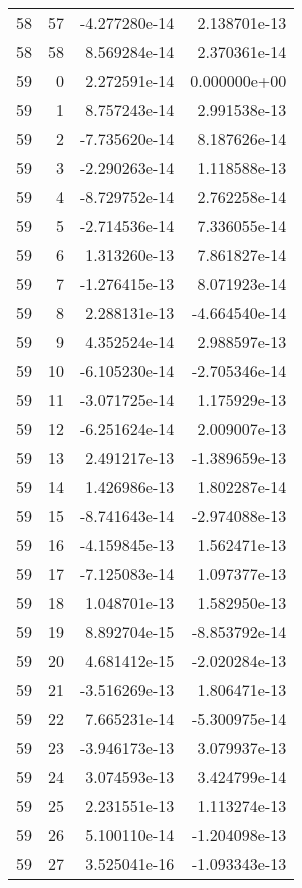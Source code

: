 \begin{tabular}{rrrr}
  58 &   57 & -4.277280e-14 &  2.138701e-13 \\
  58 &   58 &  8.569284e-14 &  2.370361e-14 \\
  59 &    0 &  2.272591e-14 &  0.000000e+00 \\
  59 &    1 &  8.757243e-14 &  2.991538e-13 \\
  59 &    2 & -7.735620e-14 &  8.187626e-14 \\
  59 &    3 & -2.290263e-14 &  1.118588e-13 \\
  59 &    4 & -8.729752e-14 &  2.762258e-14 \\
  59 &    5 & -2.714536e-14 &  7.336055e-14 \\
  59 &    6 &  1.313260e-13 &  7.861827e-14 \\
  59 &    7 & -1.276415e-13 &  8.071923e-14 \\
  59 &    8 &  2.288131e-13 & -4.664540e-14 \\
  59 &    9 &  4.352524e-14 &  2.988597e-13 \\
  59 &   10 & -6.105230e-14 & -2.705346e-14 \\
  59 &   11 & -3.071725e-14 &  1.175929e-13 \\
  59 &   12 & -6.251624e-14 &  2.009007e-13 \\
  59 &   13 &  2.491217e-13 & -1.389659e-13 \\
  59 &   14 &  1.426986e-13 &  1.802287e-14 \\
  59 &   15 & -8.741643e-14 & -2.974088e-13 \\
  59 &   16 & -4.159845e-13 &  1.562471e-13 \\
  59 &   17 & -7.125083e-14 &  1.097377e-13 \\
  59 &   18 &  1.048701e-13 &  1.582950e-13 \\
  59 &   19 &  8.892704e-15 & -8.853792e-14 \\
  59 &   20 &  4.681412e-15 & -2.020284e-13 \\
  59 &   21 & -3.516269e-13 &  1.806471e-13 \\
  59 &   22 &  7.665231e-14 & -5.300975e-14 \\
  59 &   23 & -3.946173e-13 &  3.079937e-13 \\
  59 &   24 &  3.074593e-13 &  3.424799e-14 \\
  59 &   25 &  2.231551e-13 &  1.113274e-13 \\
  59 &   26 &  5.100110e-14 & -1.204098e-13 \\
  59 &   27 &  3.525041e-16 & -1.093343e-13 \\

\end{tabular}
